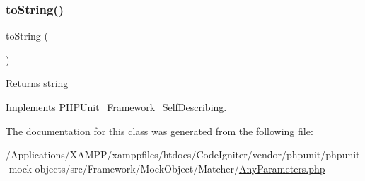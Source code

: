 \subsubsection{\texorpdfstring{to\+String()}{toString()}}
{\footnotesize\ttfamily to\+String (\begin{DoxyParamCaption}{ }\end{DoxyParamCaption})}

\begin{DoxyReturn}{Returns}
string 
\end{DoxyReturn}


Implements \mbox{\hyperlink{interface_p_h_p_unit___framework___self_describing_a5558c5d549f41597377fa1ea8a1cefa3}{P\+H\+P\+Unit\+\_\+\+Framework\+\_\+\+Self\+Describing}}.



The documentation for this class was generated from the following file\+:\begin{DoxyCompactItemize}
\item 
/\+Applications/\+X\+A\+M\+P\+P/xamppfiles/htdocs/\+Code\+Igniter/vendor/phpunit/phpunit-\/mock-\/objects/src/\+Framework/\+Mock\+Object/\+Matcher/\mbox{\hyperlink{_any_parameters_8php}{Any\+Parameters.\+php}}\end{DoxyCompactItemize}

